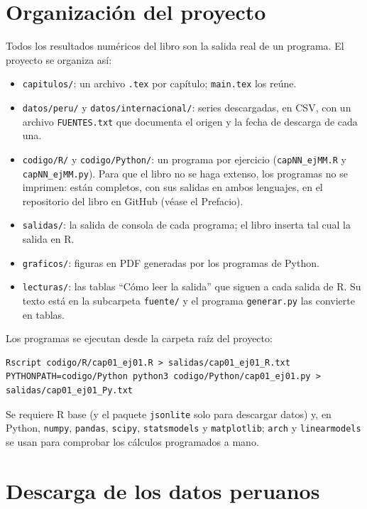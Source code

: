 \section{Organización del proyecto}

Todos los resultados numéricos del libro son la salida real de un programa. El proyecto se organiza
así:
\begin{itemize}[leftmargin=*]
  \item \texttt{capitulos/}: un archivo \texttt{.tex} por capítulo; \texttt{main.tex} los reúne.
  \item \texttt{datos/peru/} y \texttt{datos/internacional/}: series descargadas, en CSV, con un archivo
        \texttt{FUENTES.txt} que documenta el origen y la fecha de descarga de cada una.
  \item \texttt{codigo/R/} y \texttt{codigo/Python/}: un programa por ejercicio
        (\texttt{capNN\_ejMM.R} y \texttt{capNN\_ejMM.py}). Para que el libro no se haga extenso, los programas
        no se imprimen: están completos, con sus salidas en ambos lenguajes, en el repositorio del libro en GitHub (véase el Prefacio).
  \item \texttt{salidas/}: la salida de consola de cada programa; el libro inserta tal cual la salida en R.
  \item \texttt{graficos/}: figuras en PDF generadas por los programas de Python.
  \item \texttt{lecturas/}: las tablas ``Cómo leer la salida'' que siguen a cada salida de R. Su texto está
        en la subcarpeta \texttt{fuente/} y el programa \texttt{generar.py} las convierte en tablas.
\end{itemize}
Los programas se ejecutan desde la carpeta raíz del proyecto:
\begin{lstlisting}[style=salida,title={\small\sffamily\color{gray}Terminal}]
Rscript codigo/R/cap01_ej01.R > salidas/cap01_ej01_R.txt
PYTHONPATH=codigo/Python python3 codigo/Python/cap01_ej01.py > salidas/cap01_ej01_Py.txt
\end{lstlisting}
Se requiere R base (y el paquete \texttt{jsonlite} solo para descargar datos) y, en Python, \texttt{numpy},
\texttt{pandas}, \texttt{scipy}, \texttt{statsmodels} y \texttt{matplotlib}; \texttt{arch} y
\texttt{linearmodels} se usan para comprobar los cálculos programados a mano.

\section{Descarga de los datos peruanos}

